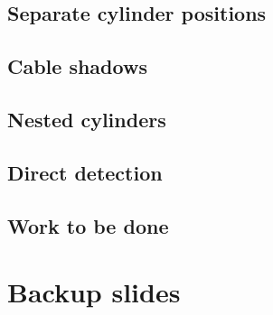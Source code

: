 \documentclass[green, 12pt]{beamer}
\begin{document}
\subsection{Separate cylinder positions}
  
\subsection{Cable shadows}
  
\subsection{Nested cylinders}
  
\subsection{Direct detection}
  

\subsection{Work to be done}
  
  



\appendix
\section{Backup slides}





\end{document}
